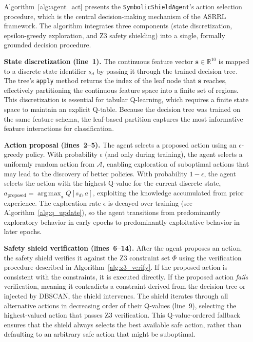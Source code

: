 \documentclass[12pt, letterpaper, oneside]{report}
\newcommand{\ASRRL}{\textsc{ASRRL}}
\newcommand{\argmax}{\operatorname*{arg\,max}}
\newcommand{\R}{\mathbb{R}}
\newcommand{\bs}{\mathbf{s}}
\begin{document}
Algorithm~\ref{alg:agent_act} presents the \texttt{SymbolicShieldAgent}'s action selection procedure, which is the central decision-making mechanism of the \ASRRL{} framework. The algorithm integrates three components (state discretization, epsilon-greedy exploration, and Z3 safety shielding) into a single, formally grounded decision procedure.

\textbf{State discretization (line~1).} The continuous feature vector $\bs \in \R^{10}$ is mapped to a discrete state identifier $s_d$ by passing it through the trained decision tree. The tree's \texttt{apply} method returns the index of the leaf node that $\bs$ reaches, effectively partitioning the continuous feature space into a finite set of regions. This discretization is essential for tabular Q-learning, which requires a finite state space to maintain an explicit Q-table. Because the decision tree was trained on the same feature schema, the leaf-based partition captures the most informative feature interactions for classification.

\textbf{Action proposal (lines~2--5).} The agent selects a proposed action using an $\epsilon$-greedy policy. With probability $\epsilon$ (and only during training), the agent selects a uniformly random action from $\mathcal{A}$, enabling exploration of suboptimal actions that may lead to the discovery of better policies. With probability $1 - \epsilon$, the agent selects the action with the highest Q-value for the current discrete state, $a_{\text{proposed}} = \argmax_a Q[s_d, a]$, exploiting the knowledge accumulated from prior experience. The exploration rate $\epsilon$ is decayed over training (see Algorithm~\ref{alg:q_update}), so the agent transitions from predominantly exploratory behavior in early epochs to predominantly exploitative behavior in later epochs.

\textbf{Safety shield verification (lines~6--14).} After the agent proposes an action, the safety shield verifies it against the Z3 constraint set $\Phi$ using the verification procedure described in Algorithm~\ref{alg:z3_verify}. If the proposed action is consistent with the constraints, it is executed directly. If the proposed action \emph{fails} verification, meaning it contradicts a constraint derived from the decision tree or injected by DBSCAN, the shield intervenes. The shield iterates through all alternative actions in decreasing order of their Q-values (line~9), selecting the highest-valued action that passes Z3 verification. This Q-value-ordered fallback ensures that the shield always selects the best available safe action, rather than defaulting to an arbitrary safe action that might be suboptimal.
\end{document}

